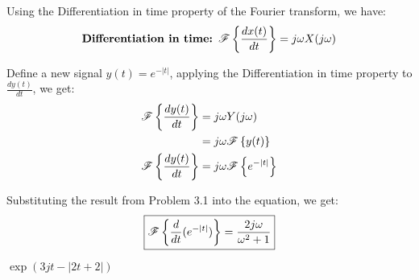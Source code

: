 \documentclass[a4paper, 10pt]{article}
\begin{document}
\begin{solution}
Using the Differentiation in time property of the Fourier transform, we have:
\[
    \textbf{Differentiation in time: } \mathscr{F} \left\{ \frac{d x(t)}{dt} \right\} = j\omega X(j\omega)
\]

Define a new signal \( y(t) = e^{-|t|} \), applying the Differentiation in time property to \( \frac{d y(t)}{dt} \), we get:
\begin{align*}  
    \mathscr{F} \left\{ \frac{d y(t)}{dt} \right\} &= j\omega Y(j\omega) \\
    &= j\omega \mathscr{F} \left\{ y(t) \right\} \\
    \mathscr{F} \left\{ \frac{d y(t)}{dt} \right\} &= j\omega \mathscr{F} \left\{ e^{-|t|} \right\}
\end{align*}

Substituting the result from Problem 3.1 into the equation, we get:
\[ \boxed{
    \mathscr{F} \left\{ \frac{d}{dt} (e^{-|t|}) \right\} = \frac{2j\omega}{\omega^2 + 1}
} \]
\end{solution}

\newpage

\begin{subsubproblems}[start=2]
    \item \( \exp(3jt-|2t+2|) \)
\end{subsubproblems}
\end{document}
